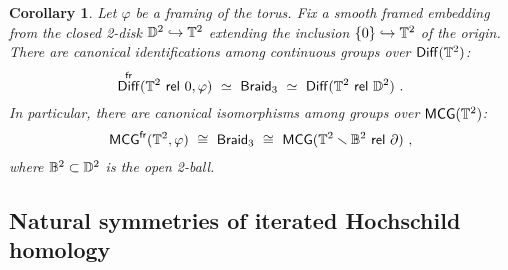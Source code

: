 \documentclass{amsart}
\newtheorem{cor}[theorem]{Corollary}
\theoremstyle{definition}
\theoremstyle{remark}
\DeclareMathOperator{\Diff}{{\sf Diff}}
\DeclareMathOperator{\fr}{\sf fr}
\DeclareMathOperator{\Braid}{{\sf Braid}_3}
\begin{document}
\begin{cor}
\label{t40}
Let $\varphi$ be a framing of the torus.
Fix a smooth framed embedding from the closed 2-disk $\mathbb D^2 \hookrightarrow \mathbb T^2$ extending the inclusion $\{0\} \hookrightarrow \mathbb T^2$ of the origin.
There are canonical identifications among continuous groups over $\Diff(\TT^2)$:
\[
\Diff^{\fr}(\TT^2~{\sf rel}~0, \varphi)
~
\simeq
~
\Braid
~\simeq~
\Diff(\TT^2 ~{\sf rel}~ \DD^2)
~.
\]
In particular, there are canonical isomorphisms among groups over ${\sf MCG}(\mathbb T^2)$:
\[
{\sf MCG}^{\fr}(\TT^2,\varphi)
~\cong~
\Braid
~\cong~
{\sf MCG}(\TT^2 \smallsetminus \BB^2 ~{\sf rel}~ \partial)
~,
\]
where $\mathbb B^2 \subset \mathbb D^2$ is the open 2-ball. 


\end{cor}



























































\subsection{Natural symmetries of iterated Hochschild homology}
\label{sec.second}
\end{document}
